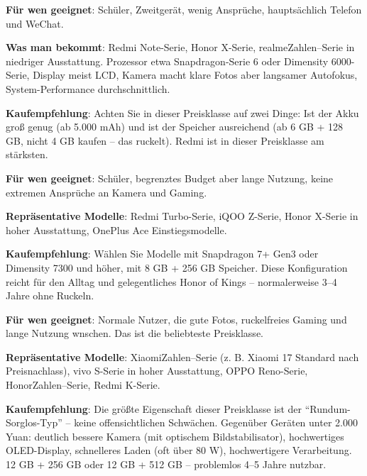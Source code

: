 
\textbf{Für wen geeignet}: Schüler, Zweitgerät, wenig Ansprüche, hauptsächlich Telefon und WeChat.

\textbf{Was man bekommt}: Redmi Note-Serie, Honor X-Serie, realmeZahlen--Serie in niedriger Ausstattung. Prozessor etwa Snapdragon-Serie 6 oder Dimensity 6000-Serie, Display meist LCD, Kamera macht klare Fotos aber langsamer Autofokus, System-Performance durchschnittlich.

\textbf{Kaufempfehlung}: Achten Sie in dieser Preisklasse auf zwei Dinge: Ist der Akku groß genug (ab 5.000 mAh) und ist der Speicher ausreichend (ab 6 GB + 128 GB, nicht 4 GB kaufen – das ruckelt). Redmi ist in dieser Preisklasse am stärksten.


\textbf{Für wen geeignet}: Schüler, begrenztes Budget aber lange Nutzung, keine extremen Ansprüche an Kamera und Gaming.

\textbf{Repräsentative Modelle}: Redmi Turbo-Serie, iQOO Z-Serie, Honor X-Serie in hoher Ausstattung, OnePlus Ace Einstiegsmodelle.

\textbf{Kaufempfehlung}: Wählen Sie Modelle mit Snapdragon 7+ Gen3 oder Dimensity 7300 und höher, mit 8 GB + 256 GB Speicher. Diese Konfiguration reicht für den Alltag und gelegentliches Honor of Kings – normalerweise 3–4 Jahre ohne Ruckeln.


\textbf{Für wen geeignet}: Normale Nutzer, die gute Fotos, ruckelfreies Gaming und lange Nutzung wnschen. Das ist die beliebteste Preisklasse.

\textbf{Repräsentative Modelle}: XiaomiZahlen--Serie (z. B. Xiaomi 17 Standard nach Preisnachlass), vivo S-Serie in hoher Ausstattung, OPPO Reno-Serie, HonorZahlen--Serie, Redmi K-Serie.

\textbf{Kaufempfehlung}: Die größte Eigenschaft dieser Preisklasse ist der “Rundum-Sorglos-Typ” – keine offensichtlichen Schwächen. Gegenüber Geräten unter 2.000 Yuan: deutlich bessere Kamera (mit optischem Bildstabilisator), hochwertiges OLED-Display, schnelleres Laden (oft über 80 W), hochwertigere Verarbeitung. 12 GB + 256 GB oder 12 GB + 512 GB – problemlos 4–5 Jahre nutzbar.


